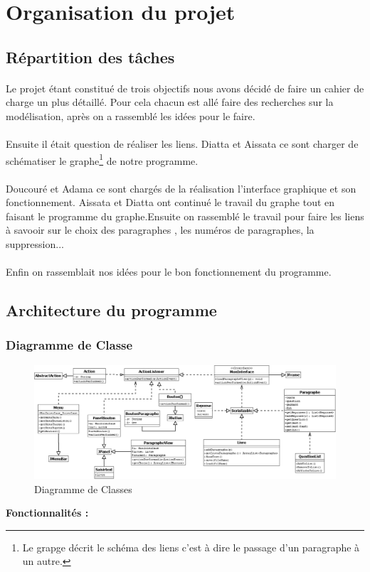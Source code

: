 \documentclass[12pt,a4paper]{article}
\begin{document}


\newpage

\section{Organisation du projet}
\subsection{Répartition des tâches}
\paragraph{}Le projet étant constitué de trois objectifs nous avons décidé de faire un cahier de charge un plus détaillé. Pour cela chacun est allé faire des recherches sur la modélisation, après on a rassemblé les idées pour le faire.
\paragraph{} Ensuite il était question de réaliser les liens. Diatta et Aissata ce sont charger de schématiser le graphe\footnote{Le grapge décrit le schéma des liens c'est à dire le passage d'un paragraphe à un autre.} de notre programme. 
\paragraph{}Doucouré et Adama ce sont chargés de la réalisation l'interface graphique et son fonctionnement. Aissata et Diatta ont continué le travail du graphe tout en faisant le programme du graphe.Ensuite on  rassemblé le travail pour faire les liens à savooir sur le choix des paragraphes , les numéros de paragraphes, la suppression...
\paragraph{}Enfin on rassemblait nos idées pour le bon fonctionnement du programme.
\subsection{Architecture du programme}
    \subsubsection{Diagramme de Classe}
    \begin{figure}[ht]
  \begin{center}
    \includegraphics[width=1.1\textwidth]{./images/DiagrammeDeClasse.png} 
  \end{center}
  \caption{Diagramme de Classes}
  \label{fig:mon_image}
\end{figure}
\textbf{Fonctionnalités : }
\end{document}
